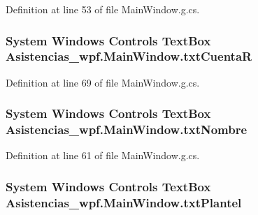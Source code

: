 Definition at line 53 of file Main\-Window.\-g.\-cs.

\hypertarget{class_asistencias__wpf_1_1_main_window_a4ce5343faaf6dc02bc33f5da846cd4db}{
\subsubsection[{txt\-Cuenta\-R}]{\setlength{\rightskip}{0pt plus 5cm}System Windows Controls Text\-Box Asistencias\-\_\-wpf.\-Main\-Window.\-txt\-Cuenta\-R\hspace{0.3cm}{\ttfamily [package]}}}\label{class_asistencias__wpf_1_1_main_window_a4ce5343faaf6dc02bc33f5da846cd4db}


Definition at line 69 of file Main\-Window.\-g.\-cs.

\hypertarget{class_asistencias__wpf_1_1_main_window_acd918b065d257146f683ff317be832a6}{
\subsubsection[{txt\-Nombre}]{\setlength{\rightskip}{0pt plus 5cm}System Windows Controls Text\-Box Asistencias\-\_\-wpf.\-Main\-Window.\-txt\-Nombre\hspace{0.3cm}{\ttfamily [package]}}}\label{class_asistencias__wpf_1_1_main_window_acd918b065d257146f683ff317be832a6}


Definition at line 61 of file Main\-Window.\-g.\-cs.

\hypertarget{class_asistencias__wpf_1_1_main_window_a20520a2029311127a68cc320e5a1aed4}{
\subsubsection[{txt\-Plantel}]{\setlength{\rightskip}{0pt plus 5cm}System Windows Controls Text\-Box Asistencias\-\_\-wpf.\-Main\-Window.\-txt\-Plantel\hspace{0.3cm}{\ttfamily [package]}}}\label{class_asistencias__wpf_1_1_main_window_a20520a2029311127a68cc320e5a1aed4}


